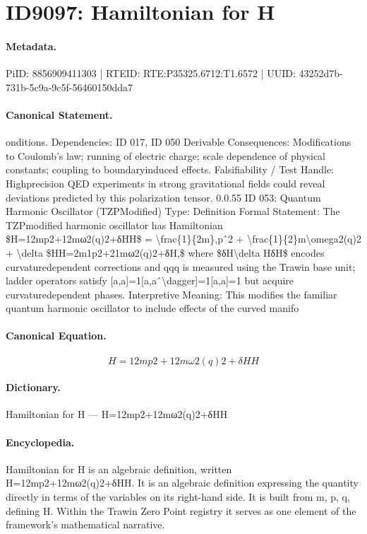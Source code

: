 \section*{ID9097: Hamiltonian for H}
\paragraph{Metadata.}
PiID: 8856909411303 | RTEID: RTE:P35325.6712:T1.6572 | UUID: 43252d7b-731b-5c9a-9c5f-56460150dda7

\paragraph{Canonical Statement.}
onditions. Dependencies: ID 017, ID 050 Derivable Consequences: Modifications to Coulomb’s law; running of electric charge; scale dependence of physical constants; coupling to boundaryinduced effects. Falsifiability / Test Handle: Highprecision QED experiments in strong gravitational fields could reveal deviations predicted by this polarization tensor. 0.0.55 ID 053: Quantum Harmonic Oscillator (TZPModified) Type: Definition Formal Statement: The TZPmodified harmonic oscillator has Hamiltonian \$H=12mp2+12mω2(q)2+δHH\$ = \textbackslash{}frac\{1\}\{2m\},pˆ2 + \textbackslash{}frac\{1\}\{2\}m\textbackslash{}omega2(q)2 + \textbackslash{}delta \$HH=2m1p2+21mω2(q)2+δH,\$ where \$δH\textbackslash{}delta HδH\$ encodes curvaturedependent corrections and qqq is measured using the Trawin base unit; ladder operators satisfy [a,a]=1[a,aˆ\textbackslash{}dagger]=1[a,a]=1 but acquire curvaturedependent phases. Interpretive Meaning: This modifies the familiar quantum harmonic oscillator to include effects of the curved manifo

\paragraph{Canonical Equation.}
\[
H=12mp2+12mω2(q)2+δHH
\]

\paragraph{Dictionary.}
Hamiltonian for H — H=12mp2+12mω2(q)2+δHH

\paragraph{Encyclopedia.}
Hamiltonian for H is an algebraic definition, written H=12mp2+12mω2(q)2+δHH. It is an algebraic definition expressing the quantity directly in terms of the variables on its right-hand side. It is built from m, p, q, defining H. Within the Trawin Zero Point registry it serves as one element of the framework's mathematical narrative.
